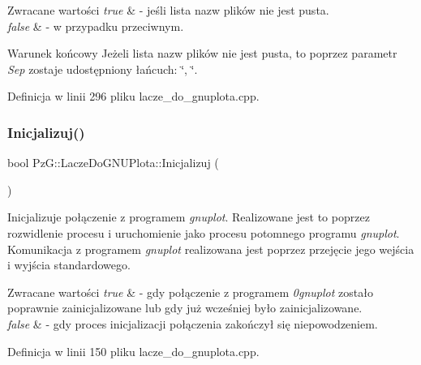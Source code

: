 \begin{DoxyRetVals}{Zwracane wartości}
{\em true} & -\/ jeśli lista nazw plików nie jest pusta. \\
\hline
{\em false} & -\/ w przypadku przeciwnym. \\
\hline
\end{DoxyRetVals}
\begin{DoxyPostcond}{Warunek końcowy}
Jeżeli lista nazw plików nie jest pusta, to poprzez parametr {\itshape Sep} zostaje udostępniony łańcuch\+: \char`\"{}, \char`\"{}. 
\end{DoxyPostcond}


Definicja w linii 296 pliku lacze\+\_\+do\+\_\+gnuplota.\+cpp.

\mbox{\label{class_pz_g_1_1_lacze_do_g_n_u_plota_a200ce6bdb980c314a9eafe49e8f2dd5e}} 
\subsubsection{\texorpdfstring{Inicjalizuj()}{Inicjalizuj()}}
{\footnotesize\ttfamily bool Pz\+G\+::\+Lacze\+Do\+G\+N\+U\+Plota\+::\+Inicjalizuj (\begin{DoxyParamCaption}{ }\end{DoxyParamCaption})}

Inicjalizuje połączenie z programem {\itshape gnuplot}. Realizowane jest to poprzez rozwidlenie procesu i uruchomienie jako procesu potomnego programu {\itshape gnuplot}. Komunikacja z programem {\itshape gnuplot} realizowana jest poprzez przejęcie jego wejścia i wyjścia standardowego.


\begin{DoxyRetVals}{Zwracane wartości}
{\em true} & -\/ gdy połączenie z programem {\itshape 0gnuplot} zostało poprawnie zainicjalizowane lub gdy już wcześniej było zainicjalizowane. \\
\hline
{\em false} & -\/ gdy proces inicjalizacji połączenia zakończył się niepowodzeniem. \\
\hline
\end{DoxyRetVals}


Definicja w linii 150 pliku lacze\+\_\+do\+\_\+gnuplota.\+cpp.

